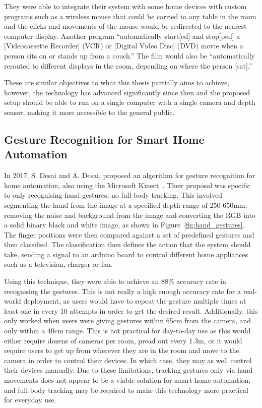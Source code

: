 They were able to integrate their system with some home devices with custom programs such as a wireless mouse that could be carried to any table in the room and the clicks and movements of the mouse would be redirected to the nearest computer display.
Another program ``automatically start[ed] and stop[ped] a [Videocassette Recorder] (VCR) or [Digital Video Disc] (DVD) movie when a person sits on or stands up from a couch.''
The film would also be ``automatically rerouted to different displays in the room, depending on where the person [sat].''

These are similar objectives to what this thesis partially aims to achieve, however, the technology has advanced significantly since then and the proposed setup should be able to run on a single computer with a single camera and depth sensor, making it more accessible to the general public.

\subsection{Gesture Recognition for Smart Home Automation}
In 2017, S. Desai and A. Desai, proposed an algorithm for gesture recognition for home automation, also using the Microsoft Kinect~\cite{Desa17}.
Their proposal was specific to only recognising hand gestures, no full-body tracking.
This involved segmenting the hand from the image at a specified depth range of 250-650mm, removing the noise and background from the image and converting the RGB into a solid binary black and white image, as shown in Figure~\ref{fig:hand_gestures}.
The finger positions were then compared against a set of predefined gestures and then classified.
The classification then defines the action that the system should take, sending a signal to an arduino board to control different home appliances such as a television, charger or fan.

Using this technique, they were able to achieve an 88\% accuracy rate in recognising the gestures.
This is not really a high enough accuracy rate for a real-world deployment, as users would have to repeat the gesture multiple times at least one in every 10 attempts in order to get the desired result.
Additionally, this only worked when users were giving gestures within 65cm from the camera, and only within a 40cm range.
This is not practical for day-to-day use as this would either require dozens of cameras per room, pread out every 1.3m, or it would require users to get up from wherever they are in the room and move to the camera in order to control their devices.
In which case, they may as well control their devices manually.
Due to these limitations, tracking gestures only via hand movements does not appear to be a viable solution for smart home automation, and full body tracking may be required to make this technology more practical for everyday use.

